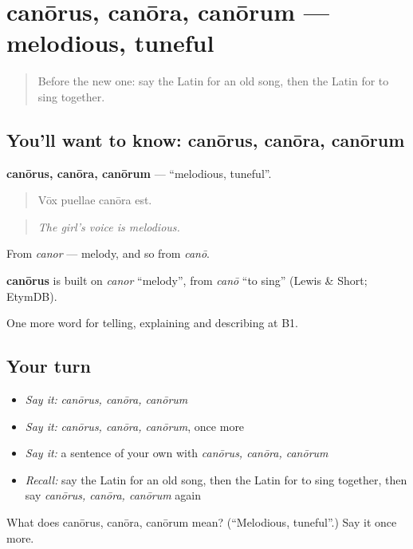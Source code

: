 \section[canōrus, canōra, canōrum]{canōrus, canōra, canōrum — melodious, tuneful}

\label{lesson:LA-C543-canorus}



\begin{quote}
Before the new one: say the Latin for an old song, then the Latin for to sing together.
\end{quote}

\subsection*{You'll want to know: canōrus, canōra, canōrum}
\textbf{canōrus, canōra, canōrum} — \textquotedblleft{}melodious, tuneful\textquotedblright{}.

\begin{quote}
Vōx puellae canōra est.
\end{quote}

\begin{quote}
\emph{The girl's voice is melodious.}
\end{quote}

From \emph{canor} — melody, and so from \emph{canō}.

\begin{cousinweb}
\textbf{canōrus} is built on \emph{canor} \textquotedblleft{}melody\textquotedblright{}, from \emph{canō} \textquotedblleft{}to sing\textquotedblright{} (Lewis \& Short; EtymDB).
\end{cousinweb}

\begin{grammarlens}[title={What you've built}]
One more word for telling, explaining and describing at B1.
\end{grammarlens}

\subsection*{Your turn}
\begin{itemize}
\raggedright
  \item \emph{Say it:} \emph{canōrus, canōra, canōrum}
  \item \emph{Say it:} \emph{canōrus, canōra, canōrum}, once more
  \item \emph{Say it:} a sentence of your own with \emph{canōrus, canōra, canōrum}
  \item \emph{Recall:} say the Latin for an old song, then the Latin for to sing together, then say \emph{canōrus, canōra, canōrum} again
\end{itemize}

\begin{tcolorbox}[breakable,colback=teal!4,colframe=teal!35!black,title={Before you move on}]
What does canōrus, canōra, canōrum mean? (\textquotedblleft{}Melodious, tuneful\textquotedblright{}.) Say it once more.
\end{tcolorbox}
